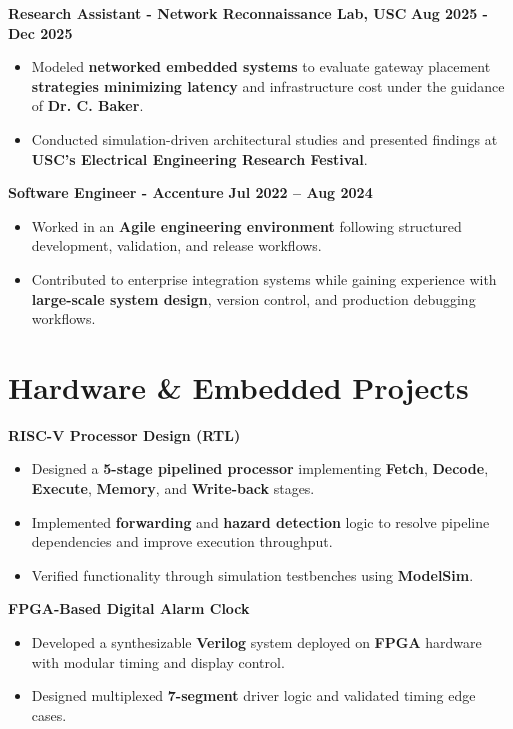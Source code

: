 \documentclass[letterpaper,11pt]{article}
\begin{document}
\textbf{Research Assistant - Network Reconnaissance Lab, USC} \hfill \textbf{Aug 2025 - Dec 2025} \\
\begin{itemize}
\item Modeled \textbf{networked embedded systems} to evaluate gateway placement \textbf{strategies minimizing latency} and infrastructure cost under the guidance of \textbf{Dr. C. Baker}.
\item Conducted simulation-driven architectural studies and presented findings at \textbf{USC's Electrical Engineering Research Festival}.
\end{itemize}

\textbf{Software Engineer - Accenture} \hfill \textbf{Jul 2022 -- Aug 2024} \\
\begin{itemize}
\item Worked in an \textbf{Agile engineering environment} following structured development, validation, and release workflows.
\item Contributed to enterprise integration systems while gaining experience with \textbf{large-scale system design}, version control, and production debugging workflows.
\end{itemize}


\section*{Hardware \& Embedded Projects}

\textbf{RISC-V Processor Design (RTL)}
\begin{itemize}
\item Designed a \textbf{5-stage pipelined processor} implementing \textbf{Fetch}, \textbf{Decode}, \textbf{Execute}, \textbf{Memory}, and \textbf{Write-back} stages.
\item Implemented \textbf{forwarding} and \textbf{hazard detection} logic to resolve pipeline dependencies and improve execution throughput.
\item Verified functionality through simulation testbenches using \textbf{ModelSim}.
\end{itemize}

\textbf{FPGA-Based Digital Alarm Clock}
\begin{itemize}
\item Developed a synthesizable \textbf{Verilog} system deployed on \textbf{FPGA} hardware with modular timing and display control.
\item Designed multiplexed \textbf{7-segment} driver logic and validated timing edge cases.

\end{itemize}
\end{document}
